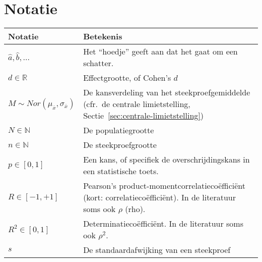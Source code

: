 \chapter{Notatie}
\label{app:notatie}

\begin{table}
  \centering
  \begin{tabular}{p{}p{}}
  	\toprule
  	\textbf{Notatie}                                        & \textbf{Betekenis}                                                                                                                     \\
  	\midrule
  	$\widehat{a}, \widehat{b}, \ldots$                      & Het ``hoedje'' geeft aan dat het gaat om een schatter.                                                                                 \\
  	$d \in \mathbb{R}$                                      & Effectgrootte, of Cohen's $d$                                                                                                          \\
  	$M \sim Nor(\mu_{\overline{x}}, \sigma_{\overline{x}})$ & De kansverdeling van het steekproefgemiddelde (cfr.~de centrale limietstelling, Sectie~\ref{sec:centrale-limietstelling})              \\
  	$N \in \mathbb{N}$                                      & De populatiegrootte                                                                                                                    \\
  	$n \in \mathbb{N}$                                      & De steekproefgrootte                                                                                                                   \\
  	$p \in [0, 1]$                                          & Een kans, of specifiek de overschrijdingskans in een statistische toets.                                                               \\
  	$R \in [-1, +1]$                                        & Pearson's product-momentcorrelatiecoëfficiënt (kort: correlatiecoëfficiënt). In de literatuur soms ook $\rho$ (rho).                   \\
  	$R^2 \in [0, 1]$                                        & Determinatiecoëfficiënt. In de literatuur soms ook $\rho^2$.                                                                           \\
  	$s$                                                     & De standaardafwijking van een steekproef                                                                                               \\

\end{tabular}
\end{table}
